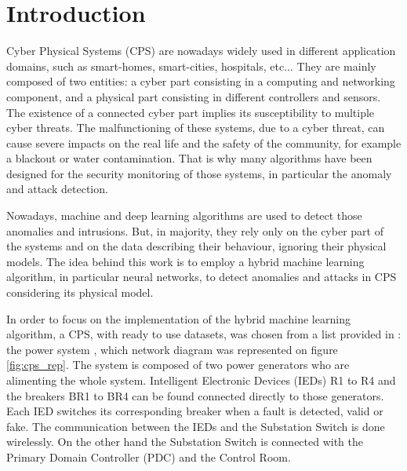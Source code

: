 \chapter{Introduction}

Cyber Physical Systems (CPS) are nowadays widely used in different application domains, such as smart-homes, smart-cities, hospitals, etc... They are mainly composed of two entities: a cyber part consisting in a computing and networking component, and a physical part consisting in different controllers and sensors. The existence of a connected cyber part implies its susceptibility to multiple cyber threats. The malfunctioning of these systems, due to a cyber threat, can cause severe impacts on the real life and the safety of the community, for example a blackout or water contamination. That is why many algorithms have been designed for the security monitoring of those systems, in particular the anomaly and attack detection.

Nowadays, machine and deep learning algorithms are used to detect those anomalies and intrusions. But, in majority, they rely only on the cyber part of the systems and on the data describing their behaviour, ignoring their physical models. The idea behind this work is to employ a hybrid machine learning algorithm, in particular neural networks, to detect anomalies and attacks in CPS considering its physical model.

In order to focus on the implementation of the hybrid machine learning algorithm, a CPS, with ready to use datasets, was chosen from a list provided in \cite{morris_industrial_nodate}: the power system \cite{adhikari_power_2014}, which network diagram was represented on figure \ref{fig:cps_rep}. The system is composed of two power generators who are alimenting the whole system. Intelligent Electronic Devices (IEDs) R1 to R4 and the breakers BR1 to BR4 can be found connected directly to those generators. Each IED switches its corresponding breaker when a fault is detected, valid or fake. The communication between the IEDs and the Substation Switch is done wirelessly. On the other hand the Substation Switch is connected with the Primary Domain Controller (PDC) and the Control Room.

